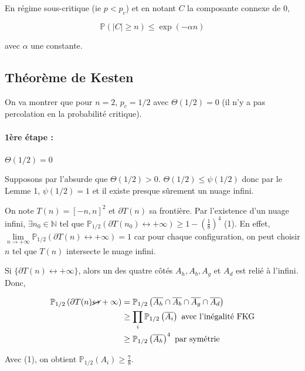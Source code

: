 \documentclass[11pt,a4paper]{article}
\begin{document}
En régime sous-critique (ie $p<p_c$) et en notant $C$ la composante connexe de $0$, 

\[\mathbb{P}\left(|C|\ge n\right) \le \exp\left(-\alpha n\right)\]

avec $\alpha$ une constante.

\subsection{Théorème de Kesten}

On va montrer que pour $n=2$, $p_c = 1/2$ avec $\Theta\left(1/2\right) = 0$ (il n'y a pas percolation en la probabilité critique).

\paragraph{1ère étape :} 

$\Theta\left(1/2\right) = 0$

Supposons par l'absurde que $\Theta\left(1/2\right) > 0$. $\Theta\left(1/2\right) \le \psi\left(1/2\right)$ donc par le Lemme 1, $\psi\left(1/2\right) = 1$ et il existe presque sûrement un nuage infini.

On note $T(n) = [-n,n]^2$ et $\partial T(n)$ sa frontière. Par l'existence d'un nuage infini, $\exists n_0 \in \mathbb{N}$ tel que $\mathbb{P}_{1/2}\left(\partial T(n_0) \leftrightarrow +\infty\right) \ge 1 - \left(\frac{1}{8}\right)^4$ (1). En effet, $\underset{n \to +\infty}{\lim}\mathbb{P}_{1/2}\left(\partial T(n) \leftrightarrow +\infty\right) = 1$ car pour chaque configuration, on peut choisir $n$ tel que $T(n)$ intersecte le nuage infini.

Si $\{\partial T(n) \leftrightarrow +\infty\}$, alors un des quatre côtés $A_h, A_b, A_g$ et $A_d$ est relié à l'infini. Donc, 

\begin{align*}
    \mathbb{P}_{1/2}\left(\partial T(n) \cancel{\leftrightarrow} +\infty\right) &= \mathbb{P}_{1/2}\left(\overline{A_h}\cap\overline{A_b}\cap\overline{A_g}\cap\overline{A_d}\right)\\
    &\ge \prod_i \mathbb{P}_{1/2}\left(\overline{A_i}\right)  \text{ avec l'inégalité FKG}\\
    &\ge \mathbb{P}_{1/2}\left(\overline{A_h}\right)^4  \text{ par symétrie}
\end{align*}

Avec (1), on obtient $\mathbb{P}_{1/2}\left(A_i\right) \ge \frac{7}{8}$.
\\
\end{document}
